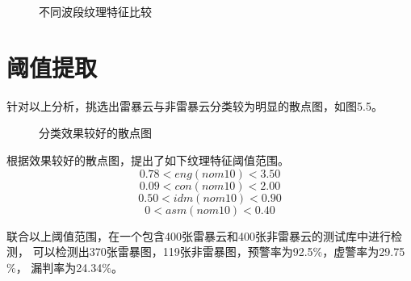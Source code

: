 \begin{figure}
    \centering
    \caption{不同波段纹理特征比较}
  \end{figure}


\section{阈值提取}
针对以上分析，挑选出雷暴云与非雷暴云分类较为明显的散点图，如图5.5。

\begin{figure}
    \centering
    \caption{分类效果较好的散点图}
  \end{figure}

根据效果较好的散点图，提出了如下纹理特征阈值范围。
\begin{equation}
    0.78<eng(nom10)<3.50
\end{equation}
\begin{equation}
    0.09<con(nom10)<2.00 
\end{equation}
\begin{equation}
    0.50<idm(nom10)<0.90
\end{equation}
\begin{equation}
    0<asm(nom10)<0.40
\end{equation}

联合以上阈值范围，在一个包含400张雷暴云和400张非雷暴云的测试库中进行检测，
可以检测出370张雷暴图，119张非雷暴图，预警率为92.5$\%$，虚警率为29.75$\%$，
漏判率为24.34$\%$。